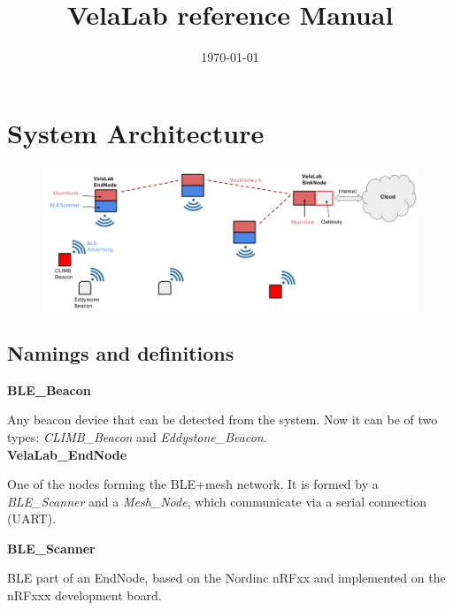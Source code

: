 \documentclass[12pt]{article}
\title{VelaLab reference Manual}
\date{\today}
\begin{document}
\maketitle




\section{System Architecture}


\begin{figure}[h]
	\centering
	\includegraphics[width=0.98\columnwidth]{fig/Architecture.png}
	\caption{}
	\label{fig:system}
\end{figure}



\subsection{Namings and definitions}

\textbf{BLE\_Beacon}

Any beacon device that can be detected from the system. Now it can be of two types: \textit{CLIMB\_Beacon} and  \textit{Eddystone\_Beacon}.
\\

\noindent \textbf{VelaLab\_EndNode}

One of the nodes forming the BLE+mesh network. It is formed by a \textit{BLE\_Scanner} and a \textit{Mesh\_Node}, which communicate via a serial connection (UART).


\noindent \textbf{BLE\_Scanner}

BLE part of an EndNode, based on the Nordinc nRFxx and implemented on the nRFxxx development board.
\\
\end{document}
